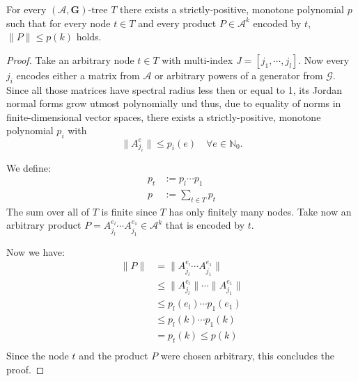 \begin{lemma}
    \label{lem:poly_bound}
    For every $(\mathcal{A},\mathbf{G})\text{-tree } T$ there exists a strictly-positive, monotone polynomial $p$ such that for every node $t \in T$ and every product $P \in \mathcal{A}^k$ encoded by $t$, $\lVert P \rVert \le p(k)$ holds.
\end{lemma}
  
\begin{proof}
    Take an arbitrary node $t \in T$ with multi-index $J = [j_1, \cdots, j_l]$. 
    Now every $j_i$ encodes either a matrix from $\mathcal{A}$ or arbitrary powers of a generator from $\mathcal{G}$. 
    Since all those matrices have spectral radius less then or equal to 1, its Jordan normal forms grow utmost polynomially und thus, due to equality of norms in finite-dimensional vector spaces, there exists a strictly-positive, monotone polynomial $p_i$ with 
    $$ 
    \lVert A_{j_i}^{e} \rVert \le p_i(e) \quad \forall e \in \mathbb{N}_0.
    $$

    We define: 
    $$
    \begin{aligned}
    p_t & := p_{l} \cdots p_{1} \\
    p & := \sum \limits_{t \in T} p_t
    \end{aligned}
    $$
    The sum over all of $T$ is finite since $T$ has only finitely many nodes. 
    Take now an arbitrary product $P = A_{j_l}^{e_{l}}\cdots A_{j_1}^{e_1} \in \mathcal{A}^k$ that is encoded by $t$.
    
    Now we have: 
    $$
    \begin{aligned}
    \lVert P \rVert & = \lVert A_{j_l}^{e_{l}} \cdots A_{j_1}^{e_{1}} \rVert \\
    & \leq \lVert A_{j_l}^{e_{l}} \rVert \cdots \lVert A_{j_1}^{e_{1}} \rVert \\
    & \leq p_{l}(e_l) \cdots p_{1}(e_1) \\
    & \leq p_{l}( k) \cdots p_{1}( k) \\
    & = p_t( k) \leq p( k) \\
    \end{aligned}
    $$
    Since the node $t$ and the product $P$ were chosen arbitrary, this concludes the proof. 
\end{proof}

